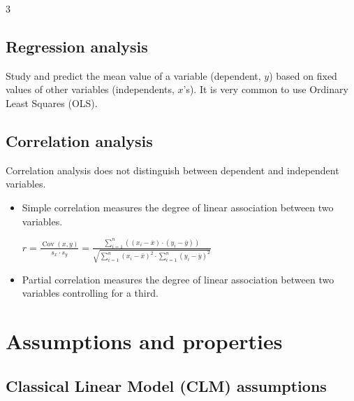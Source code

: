 \documentclass[10pt, a4paper, landscape]{article}
\DeclareMathOperator{\Cov}{Cov}
\begin{document}
\begin{multicols}{3}
\subsection*{Regression analysis}

Study and predict the mean value of a variable (dependent, \( y \)) based on fixed values of other variables (independents, \( x \)'s). It is very common to use Ordinary Least Squares (OLS).

\subsection*{Correlation analysis}

Correlation analysis does not distinguish between dependent and independent variables.

\begin{itemize}[leftmargin=*]
	\item Simple correlation measures the degree of linear association between two variables.
	\begin{center}
		\( r = \frac{\Cov(x, y)}{s_{x} \cdot s_{y}} = \frac{\sum_{i = 1}^{n} \left( (x_{i} - \overline{x}) \cdot (y_{i} - \overline{y}) \right)}{\sqrt{\sum_{i = 1}^{n} (x_{i} - \overline{x})^{2} \cdot \sum_{i = 1}^{n} (y_{i} - \overline{y})^{2}}} \)
	\end{center}
	\item Partial correlation measures the degree of linear association between two variables controlling for a third.
\end{itemize}

\columnbreak

\section*{Assumptions and properties}

\subsection*{Classical Linear Model (CLM) assumptions}


\end{multicols}
\end{document}
